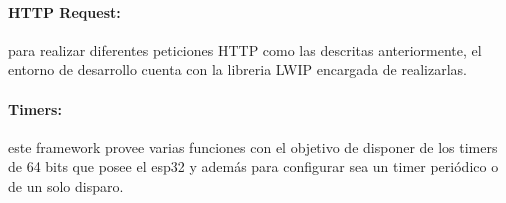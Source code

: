 \paragraph{HTTP Request:}para realizar diferentes peticiones HTTP como las descritas anteriormente, el entorno de desarrollo cuenta con la libreria LWIP encargada de realizarlas.

\paragraph{Timers:}este framework provee varias funciones con el objetivo de disponer de los timers de 64 bits que posee el esp32 y además para configurar sea un timer periódico o de un solo disparo.